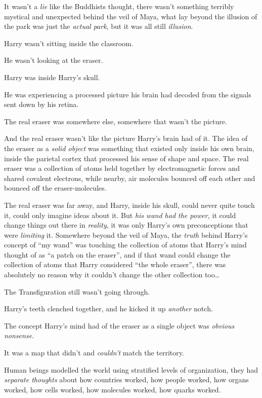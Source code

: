 It wasn’t a \emph{lie} like the Buddhists thought, there wasn’t something terribly mystical and unexpected behind the veil of Maya, what lay beyond the illusion of the park was just the \emph{actual park}, but it was all still \emph{illusion}.

Harry wasn’t sitting inside the classroom.

He wasn’t looking at the eraser.

Harry was inside Harry’s skull.

He was experiencing a processed picture his brain had decoded from the signals sent down by his retina.

The real eraser was somewhere else, somewhere that wasn’t the picture.

And the real eraser wasn’t like the picture Harry’s brain had of it. The idea of the eraser as a \emph{solid object} was something that existed only inside his own brain, inside the parietal cortex that processed his sense of shape and space. The real eraser was a collection of atoms held together by electromagnetic forces and shared covalent electrons, while nearby, air molecules bounced off each other and bounced off the eraser-molecules.

The real eraser was far away, and Harry, inside his skull, could never quite touch it, could only imagine ideas about it. But \emph{his wand had the power,} it could change things out there in \emph{reality}, it was only Harry’s own preconceptions that were \emph{limiting} it. Somewhere beyond the veil of Maya, the \emph{truth} behind Harry’s concept of “my wand” was touching the collection of atoms that Harry’s mind thought of as “a patch on the eraser”, and if that wand could change the collection of atoms that Harry considered “the whole eraser”, there was absolutely no reason why it couldn’t change the other collection too…

The Transfiguration still wasn’t going through.

Harry’s teeth clenched together, and he kicked it up \emph{another} notch.

The concept Harry’s mind had of the eraser as a single object was \emph{obvious nonsense.}

It was a map that didn’t and \emph{couldn’t} match the territory.

Human beings modelled the world using stratified levels of organization, they had \emph{separate thoughts} about how countries worked, how people worked, how organs worked, how cells worked, how molecules worked, how quarks worked.

